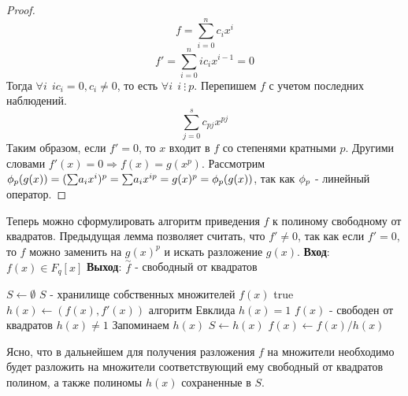 \begin{proof}
  \[ f = \overset{n}{\underset{i=0}{\sum}} c_{i}x^{i} \]
  \[ f' = \overset{n}{\underset{i=0}{\sum}} ic_{i}x^{i - 1} = 0 \]
  Тогда $ \forall i ~~ ic_i = 0, c_i \ne 0 $, то есть $ \forall i ~~ i ~ \vdots ~ p $. 
  Перепишем $ f $ с учетом последних наблюдений.
  \[ \overset{s}{\underset{j = 0}{\sum}} c_{pj}x^{pj} \]
  Таким образом, если $ f' = 0 $, то $ x $ входит в $ f $ со степенями кратными $ p $. Другими словами
  $ f'(x) = 0 \Rightarrow f(x) = g(x^p) $. 
  Рассмотрим $ \phi_{p}(g(x)) = ({\sum}a_ix^i)^p = {\sum}a_ix^{ip} = g(x)^p = \phi_{p}(g(x)) $, так как $ \phi_{p} $ -
  линейный оператор. 
\end{proof}

Теперь можно сформулировать алгоритм приведения $ f $ к полиному свободному от квадратов. Предыдущая лемма
позволяет считать, что $ f' \ne 0 $, так как если $ f' = 0 $, то $ f $ можно заменить на $ g(x)^p $ и искать
разложение $ g(x) $. \newline  \newline
{\bf{Вход}}: $ f(x) \in F_q[x] $ {\bf{Выход}}: $ \overset{\sim}{f} $ - свободный от квадратов \newline

\begin{codebox}
    \li $ S \gets \emptyset $ \Comment $ S $ - хранилище собственных множителей $ f(x) $
    \li \While true
      \li \Do $ h(x) \gets (f(x), f'(x)) $ \Comment алгоритм Евклида
      \li \If $ h(x) = 1 $ 
        \li \Do \Return \Comment $ f(x) $ - свободен от квадратов
	\li \End
      \li \If $ h(x) \ne 1 $
       \li \Comment Запоминаем $ h(x) $
        \li \Do $ S \gets h(x) $ 
	  \li $ f(x) \gets f(x) / h(x) $
\end{codebox}

Ясно, что в дальнейшем для получения разложения $ f $ на множители необходимо будет разложить на множители
соответствующий ему свободный от квадратов полином, а также полиномы $ h(x) $ сохраненные в $ S $.



